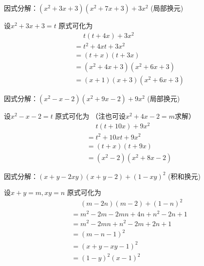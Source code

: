 \documentclass[windows,csize4]{BHCexam}
\begin{document}
\begin{groups}
\begin{questions}[]
        \question[5] 因式分解：$(x^2+3x+3)(x^2+7x+3)+3x^2$ (局部换元)
        \begin{solution}{0.5cm}
            \methodonly 设$x^2+3x+3=t$ 原式可化为
            \[
                \begin{aligned}
                     & \phantom{=}t(t+4x)+3x^2 \\
                     & = t^2+4xt+3x^2          \\
                     & = (t+x)(t+3x) \\ 
                     & = (x^2+4x+3)(x^2+6x+3)  \\
                     & = (x+1)(x+3)(x^2+6x+3)
                \end{aligned}
            \]
        \end{solution}
        \vspace{3.5cm}

        \question[5] 因式分解：$(x^2-x-2)(x^2+9x-2)+9x^2$ (局部换元)
        \begin{solution}{0.5cm}
            \methodonly 设$x^2-x-2=t$ 原式可化为 （注也可设$x^2+4x-2=m$求解）
            \[
                \begin{aligned}
                     & \phantom{=}t(t+10x)+9x^2 \\
                     & = t^2+10xt+9x^2          \\
                     & = (t+x)(t+9x)            \\
                     & = (x^2-2)(x^2+8x-2)
                \end{aligned}
            \]
        \end{solution}
        \vspace{3.5cm}

        \question[5] 因式分解：$(x+y-2xy)(x+y-2)+(1-xy)^2$ (积和换元)
        \begin{solution}{0.5cm}
            \methodonly 设$x+y=m,xy=n$ 原式可化为
            \[
                \begin{aligned}
                     & \phantom{=}(m-2n)(m-2)+(1-n)^2 \\
                     & = m^2-2m-2mn+4n+n^2-2n+1       \\
                     & = m^2-2mn+n^2-2m+2n+1          \\ %
                     & = (m-n-1)^2                    \\
                     & = (x+y-xy-1)^2                 \\
                     & = (1-y)^2(x-1)^2
                \end{aligned}
            \]
        \end{solution}
        \vspace{3.5cm}


\end{questions}
\end{groups}
\end{document}
